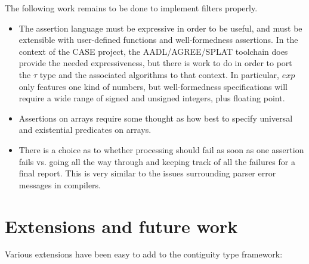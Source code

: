 \documentclass[svgnames]{llncs}
\begin{document}
\noindent The following work remains to be done to implement filters
properly.

\begin{itemize}

\item The assertion language must be expressive in order to be useful,
  and must be extensible with user-defined functions and
  well-formedness assertions. In the context of the CASE project, the
  AADL/AGREE/SPLAT toolchain does provide the needed expressiveness,
  but there is work to do in order to port the $\tau$ type and the
  associated algorithms to that context. In particular, $\mathit{exp}$
  only features one kind of numbers, but well-formedness
  specifications will require a wide range of signed and unsigned
  integers, plus floating point.

\item Assertions on arrays require some thought as how best to specify
  universal and existential predicates on arrays.

\item There is a choice as to whether processing should fail as soon
  as one assertion fails vs. going all the way through and keeping
  track of all the failures for a final report. This is very similar
  to the issues surrounding parser error messages in compilers.

\end{itemize}

\section{Extensions and future work}

Various extensions have been easy to add to the contiguity type
framework:
\end{document}
